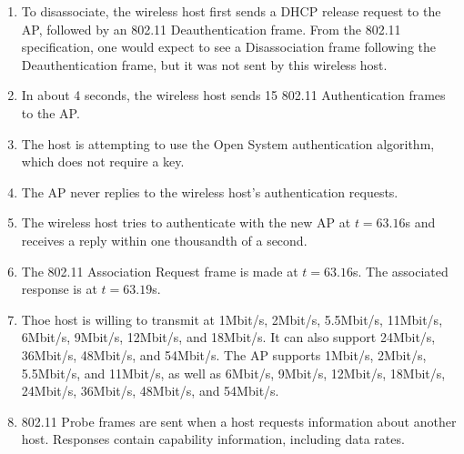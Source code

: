 \documentclass[11pt]{article}
\begin{document}
\begin{enumerate}
  \item To disassociate, the wireless host first sends a DHCP release request to
    the AP, followed by an 802.11 Deauthentication frame.  From the 802.11
    specification, one would expect to see a Disassociation frame following the
    Deauthentication frame, but it was not sent by this wireless host.

  \item In about 4 seconds, the wireless host sends 15 802.11 Authentication
    frames to the AP.

  \item The host is attempting to use the Open System authentication algorithm,
    which does not require a key.

  \item The AP never replies to the wireless host's authentication requests.

  \item The wireless host tries to authenticate with the new AP at $t=63.16$s
    and receives a reply within one thousandth of a second.

  \item The 802.11 Association Request frame is made at $t=63.16$s.  The
    associated response is at $t=63.19$s.

  \item Thoe host is willing to transmit at 1Mbit/s, 2Mbit/s, 5.5Mbit/s,
    11Mbit/s, 6Mbit/s, 9Mbit/s, 12Mbit/s, and 18Mbit/s.  It can also support
    24Mbit/s, 36Mbit/s, 48Mbit/s, and 54Mbit/s.  The AP supports 1Mbit/s, 2Mbit/s, 5.5Mbit/s,
    and 11Mbit/s, as well as 6Mbit/s, 9Mbit/s, 12Mbit/s, 18Mbit/s, 24Mbit/s,
    36Mbit/s, 48Mbit/s, and 54Mbit/s.

  \item 802.11 Probe frames are sent when a host requests information about
    another host.  Responses contain capability information, including data
    rates.

\end{enumerate}
\end{document}
